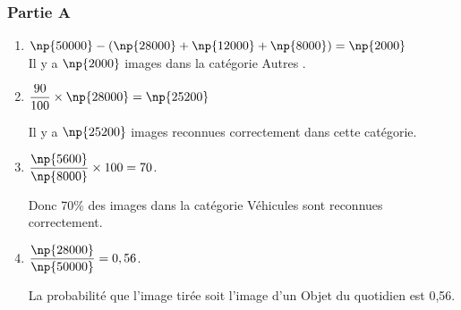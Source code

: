 

\subsubsection*{Partie A}





\begin{enumerate}
	\item $\np{50000}-(\np{28 000}+\np{12000}+\np{8000})=\np{2000}$ \\
	Il y a $\np{2000}$ images dans la catégorie \og Autres \fg{}.
	\item $\dfrac{90}{100}\times \np{28000}=\np{25200}$

	Il y a $\np{25200}$ images reconnues correctement dans cette catégorie.
	\item $\dfrac{\np{5600}}{\np{8000}}\times 100=70$.

	Donc 70\% des images dans la catégorie \og Véhicules \fg{} sont reconnues correctement. 
	\item $\dfrac{\np{28000}}{\np{50000}}=0,56$.
	
	La probabilité que l'image tirée soit l'image d'un \og Objet du quotidien \fg{} est 0,56.
\end{enumerate}

